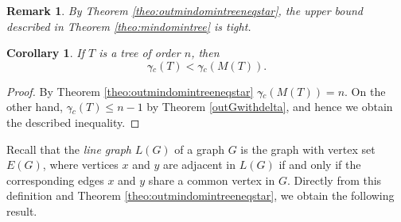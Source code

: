 \documentclass[a4paper,12pt, reqno]{amsart}
\newtheorem{Corollary}[Theorem]{Corollary}
\newtheorem{Remark}[Theorem]{Remark}
\begin{document}
\begin{Remark}
By Theorem \ref{theo:outmindomintreeneqstar}, the upper bound described in Theorem \ref{theo:mindomintree} is tight.
\end{Remark}

\begin{Corollary}\label{gamaact<gamactildt}
If $T$ is a tree of order $n$, then
$$\gamma{\tilde{}} _{c}(T) <\gamma{\tilde{}} _{c}(M(T)). $$
\end{Corollary}
\begin{proof} By Theorem \ref{theo:outmindomintreeneqstar} $\gamma{\tilde{}} _{c}(M(T))=n$. On the other hand, $\gamma{\tilde{}} _{c}(T)\leq n-1$ by Theorem \ref{outGwithdelta}, and hence we obtain the described inequality.
\end{proof}

Recall that the \emph{line graph} $L(G)$ of a graph $G$ is the graph with vertex set $E(G)$, where vertices $x$ and $y$ are adjacent in $L(G)$ if and only if the corresponding edges $x$ and $y$ share a common vertex in $G$. Directly from this definition and Theorem \ref{theo:outmindomintreeneqstar}, we obtain the following result.
\end{document}
